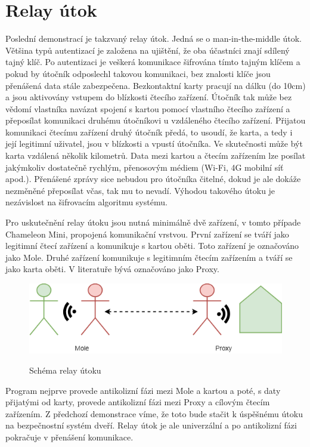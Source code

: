 \section{Relay útok}

Poslední demonstrací je takzvaný relay útok. Jedná se o {man-in-the-middle} útok. Většina typů autentizací je založena na ujištění, že oba účastníci znají sdílený tajný klíč. Po autentizaci je veškerá komunikace šifrována tímto tajným klíčem a pokud by útočník odposlechl takovou komunikaci, bez znalosti klíče jsou přenášená data stále zabezpečena. Bezkontaktní karty pracují na dálku (do 10cm) a jsou aktivovány vstupem do blízkosti čtecího zařízení. Útočník tak může bez vědomí vlastníka navázat spojení s kartou pomocí vlastního čtecího zařízení a přeposílat komunikaci druhému útočníkovi u vzdáleného čtecího zařízení. Přijatou komunikaci čtecímu zařízení druhý útočník předá, to usoudí, že karta, a tedy i její legitimní uživatel, jsou v blízkosti a vpustí útočníka. Ve skutečnosti může být karta vzdálená několik kilometrů. Data mezi kartou a čtecím zařízením lze posílat jakýmkoliv dostatečně rychlým, přenosovým médiem ({Wi-Fi}, 4G mobilní síť apod.). Přenášené zprávy sice nebudou pro útočníka čitelné, dokud je ale dokáže nezměněné přeposílat včas, tak mu to nevadí. Výhodou takového útoku je nezávislost na šifrovacím algoritmu systému.\par

Pro uskutečnění relay útoku jsou nutná minimálně dvě zařízení, v tomto případe Chameleon Mini, propojená komunikační vrstvou. První zařízení se tváří jako legitimní čtecí zařízení a komunikuje s kartou oběti. Toto zařízení je označováno jako Mole. Druhé zařízení komunikuje s legitimním čtecím zařízením a tváří se jako karta oběti. V literatuře bývá označováno jako Proxy.\cite{PracticalRelayAttack} \par


\begin{figure}[ht]\centering
  \centering
  \includegraphics[width=\linewidth]{obrazky-figures/relayAttack.png}\\[1pt]  
  \caption{Schéma relay útoku}    
  \label{obrazekRelayAttack}
\end{figure}
Program nejprve provede antikolizní fázi mezi Mole a kartou a poté, s daty přijatými od karty, provede antikolizní fázi mezi Proxy a cílovým čtecím zařízením. Z předchozí demonstrace víme, že toto bude stačit k úspěšnému útoku na bezpečnostní systém dveří. Relay útok je ale univerzální a po antikolizní fázi pokračuje v přenášení komunikace. 

